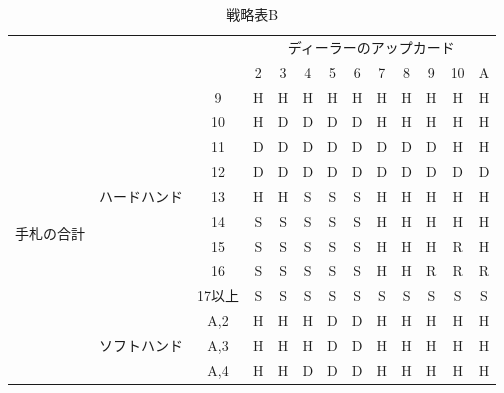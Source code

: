 \begin{table}[H]
    \begin{center}
    \caption{戦略表B}
    \begin{tabular}{|c|c|c|c|c|c|c|c|c|c|c|c|c|}
    \hline
    \multicolumn{3}{|c|}{\multirow{2}{*}{}}                     & \multicolumn{10}{c|}{ディーラーのアップカード}     \\ \cline{4-13} 
    \multicolumn{3}{|c|}{}                                      & 2 & 3 & 4 & 5 & 6 & 7 & 8 & 9 & 10 & A \\ \hline
    \multirow{28}{*}{手札の合計} & \multirow{9}{*}{ハードハンド}   & 9     & H & H & H & H & H & H & H & H & H  & H \\ \cline{3-13} 
                            &                           & 10    & H & D & D & D & D & H & H & H & H  & H \\ \cline{3-13} 
                            &                           & 11    & D & D & D & D & D & D & D & D & H  & H \\ \cline{3-13} 
                            &                           & 12    & D & D & D & D & D & D & D & D & D  & D \\ \cline{3-13} 
                            &                           & 13    & H & H & S & S & S & H & H & H & H  & H \\ \cline{3-13} 
                            &                           & 14    & S & S & S & S & S & H & H & H & H  & H \\ \cline{3-13} 
                            &                           & 15    & S & S & S & S & S & H & H & H & R  & H \\ \cline{3-13} 
                            &                           & 16    & S & S & S & S & S & H & H & R & R  & R \\ \cline{3-13} 
                            &                           & 17以上  & S & S & S & S & S & S & S & S & S  & S \\ \cline{2-13} 
                            & \multirow{9}{*}{ソフトハンド}   & A,2   & H & H & H & D & D & H & H & H & H  & H \\ \cline{3-13} 
                            &                           & A,3   & H & H & H & D & D & H & H & H & H  & H \\ \cline{3-13} 
                            &                           & A,4   & H & H & D & D & D & H & H & H & H  & H \\ \cline{3-13} 

\end{tabular}
\end{center}
\end{table}
